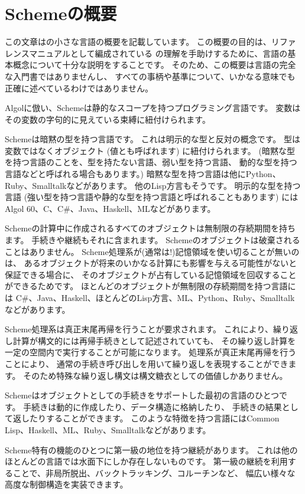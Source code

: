 \chapter*{Schemeの概要}

この文章は\rsevenrs{}の小さな言語の概要を記載しています。
この概要の目的は、リファレンスマニュアルとして編成されている
\rsevenrs{}の理解を手助けするために、言語の基本概念について十分な説明をすることです。
そのため、この概要は言語の完全な入門書ではありませんし、
すべての事柄や基準について、いかなる意味でも正確に述べているわけではありません。

\vest Algolに倣い、Schemeは静的なスコープを持つプログラミング言語です。
変数はその変数の字句的に見えている束縛に紐付けられます。

\vest Schemeは暗黙の型を持つ言語です。
これは明示的な型と反対の概念です。
型は変数ではなくオブジェクト (値とも呼ばれます) に紐付けられます。
(暗黙な型を持つ言語のことを、型を持たない言語、弱い型を持つ言語、
動的な型を持つ言語などと呼ばれる場合もあります。)
暗黙な型を持つ言語は他にPython、Ruby、Smalltalkなどがあります。
他のLisp方言もそうです。
明示的な型を持つ言語
(強い型を持つ言語や静的な型を持つ言語と呼ばれることもあります)
にはAlgol 60、C、C\#、Java、Haskell、MLなどがあります。

\vest Schemeの計算中に作成されるすべてのオブジェクトは無制限の存続期間を持ちます。
手続きや継続もそれに含まれます。
Schemeのオブジェクトは破棄されることはありません。
Scheme処理系が(通常は!)記憶領域を使い切ることが無いのは、
あるオブジェクトが将来のいかなる計算にも影響を与える可能性がないと保証できる場合に、
そのオブジェクトが占有している記憶領域を回収することができるためです。
ほとんどのオブジェクトが無制限の存続期間を持つ言語には
C\#、Java、Haskell、ほとんどのLisp方言、ML、Python、Ruby、Smalltalkなどがあります。

Scheme処理系は真正末尾再帰を行うことが要求されます。
これにより、繰り返し計算が構文的には再帰手続きとして記述されていても、
その繰り返し計算を一定の空間内で実行することが可能になります。
処理系が真正末尾再帰を行うことにより、
通常の手続き呼び出しを用いて繰り返しを表現することができます。
そのため特殊な繰り返し構文は構文糖衣としての価値しかありません。

\vest Schemeはオブジェクトとしての手続きをサポートした最初の言語のひとつです。
手続きは動的に作成したり、データ構造に格納したり、
手続きの結果として返したりすることができます。
このような特徴を持つ言語にはCommon Lisp、Haskell、ML、Ruby、Smalltalkなどがあります。

\vest Scheme特有の機能のひとつに第一級の地位を持つ継続があります。
これは他のほとんどの言語では水面下にしか存在しないものです。
第一級の継続を利用することで、非局所脱出、バックトラッキング、コルーチンなど、
幅広い様々な高度な制御構造を実装できます。

